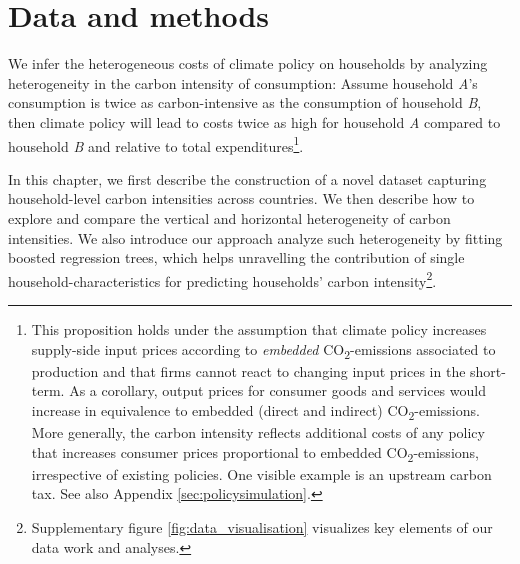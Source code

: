 \documentclass[12pt, a4paper]{article}
\begin{document}

\section{Data and methods} \label{sec:data_methods}

We infer the heterogeneous costs of climate policy on households by analyzing heterogeneity in the carbon intensity of consumption: Assume household \textit{A}'s consumption is twice as carbon-intensive as the consumption of household \textit{B}, then climate policy will lead to costs twice as high for household \textit{A} compared to household \textit{B} and relative to total expenditures\footnote{This proposition holds under the assumption that climate policy increases supply-side input prices according to \textit{embedded} CO\textsubscript{2}-emissions associated to production and that firms cannot react to changing input prices in the short-term. As a corollary, output prices for consumer goods and services would increase in equivalence to embedded (direct and indirect) CO\textsubscript{2}-emissions. More generally, the carbon intensity reflects additional costs of any policy that increases consumer prices proportional to embedded CO\textsubscript{2}-emissions, irrespective of existing policies. One visible example is an upstream carbon tax. See also Appendix \ref{sec:policysimulation}.}.

In this chapter, we first describe the construction of a novel dataset capturing household-level carbon intensities across countries. We then describe how to explore and compare the vertical and horizontal heterogeneity of carbon intensities. We also introduce our approach analyze such heterogeneity by fitting boosted regression trees, which helps unravelling the contribution of single household-characteristics for predicting households' carbon intensity\footnote{Supplementary figure \ref{fig:data_visualisation} visualizes key elements of our data work and analyses.}.
\end{document}

